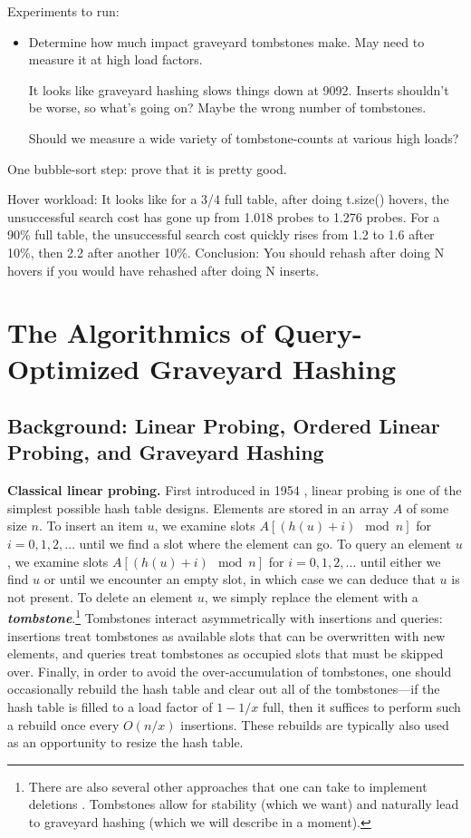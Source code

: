 \documentclass[10pt]{article}
\theoremstyle{remark}
\theoremstyle{remark}
\newcommand{\defn}[1]{\textbf{\emph{#1}}}
\renewcommand{\paragraph}[1]{\vspace{.2 cm} \noindent \textbf{#1}}
\begin{document}
Experiments to run:
\begin{itemize}
\item Determine how much impact graveyard tombstones make.  May need to measure it at high load factors.

  It looks like graveyard hashing slows things down at 9092.  Inserts shouldn't be worse, so what's going on?  Maybe the wrong number of tombstones.

  Should we measure a wide variety of tombstone-counts at various high loads?
\end{itemize}

One bubble-sort step: prove that it is pretty good.

Hover workload: It looks like for a 3/4 full table, after doing t.size() hovers, the unsuccessful search cost has gone up from 1.018 probes to 1.276 probes.
For a 90\% full table, the unsuccessful search cost quickly rises from 1.2 to 1.6 after 10\%, then 2.2 after another 10\%.
Conclusion:  You should rehash after doing N hovers if you would have rehashed after doing N inserts.

\section{The Algorithmics of Query-Optimized Graveyard Hashing}

\subsection{Background: Linear Probing, Ordered Linear Probing, and Graveyard Hashing}

\paragraph{Classical linear probing.} First introduced in 1954 \cite{??}, linear probing is one of the simplest possible hash table designs. Elements are stored in an array $A$ of some size $n$. To insert an item $u$, we examine slots $A[(h(u) + i) \mod n]$ for $i = 0, 1, 2, \ldots$ until we find a slot where the element can go. To query an element $u$,  we examine slots $A[(h(u) + i) \mod n]$ for $i = 0, 1, 2, \ldots$ until either we find $u$ or until we encounter an empty slot, in which case we can deduce that $u$ is not present. To delete an element $u$, we simply replace the element with a \defn{tombstone}.\footnote{There are also several other approaches that one can take to implement deletions \cite{...}. Tombstones allow for stability (which we want) and naturally lead to graveyard hashing (which we will describe in a moment).} Tombstones interact asymmetrically with insertions and queries: insertions treat tombstones as available slots that can be overwritten with new elements, and queries treat tombstones as occupied slots that must be skipped over. Finally, in order to avoid the over-accumulation of tombstones, one should occasionally rebuild the hash table and clear out all of the tombstones---if the hash table is filled to a load factor of $1 - 1/x$ full, then it suffices to perform such a rebuild once every $O(n/x)$ insertions. These rebuilds are typically also used as an opportunity to resize the hash table.
\end{document}
